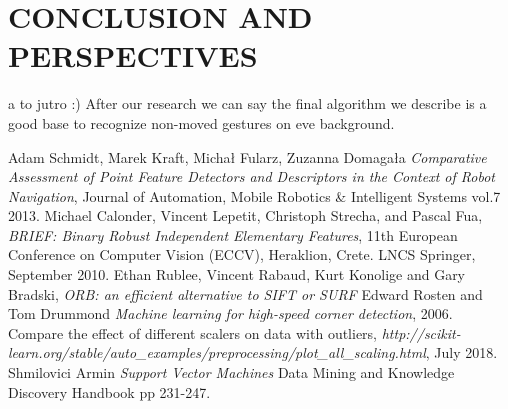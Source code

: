 \documentclass[11pt,a4paper]{article}
\begin{document}
\section{CONCLUSION AND PERSPECTIVES}

a to jutro :)
After our research we can say the final algorithm we describe is a good base to recognize non-moved gestures on eve background.


\begin{thebibliography}{99}
 \setlength\baselineskip{5pt}
%

Adam Schmidt, Marek Kraft, Micha\l $ $ Fularz, Zuzanna Domaga\l a 
\textit{Comparative Assessment of Point Feature Detectors and Descriptors in the Context of Robot Navigation},
Journal of Automation, Mobile Robotics \& Intelligent Systems vol.7 2013.
Michael Calonder, Vincent Lepetit, Christoph Strecha, and Pascal Fua, 
\textit{BRIEF: Binary Robust Independent Elementary Features}, 11th European Conference on Computer Vision (ECCV), Heraklion, Crete. LNCS Springer, September 2010.
Ethan Rublee, Vincent Rabaud, Kurt Konolige and Gary Bradski, 
\textit{ORB: an efficient alternative to SIFT or SURF}
 Edward Rosten and Tom Drummond
\textit{Machine learning for high-speed corner detection},
 2006.
Compare the effect of different scalers on data with outliers,
\textit{http://scikit-learn.org/stable/auto\_examples/preprocessing/plot\_all\_scaling.html},
July 2018.
 Shmilovici Armin \textit{Support Vector Machines} Data Mining and Knowledge Discovery Handbook pp 231-247.


\end{thebibliography}

\listoffigures

\listoftables
\end{document}
